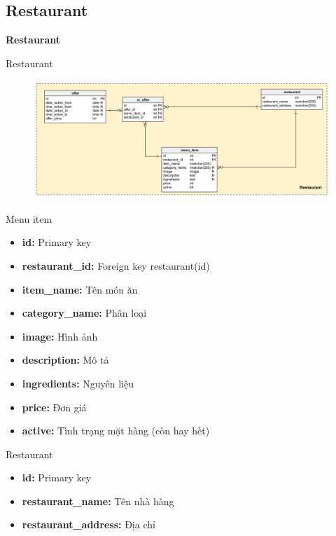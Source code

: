 \documentclass[aspectratio=43,xcolor=dvipsnames]{beamer}
\begin{document}
	\subsection{Restaurant}
	\begin{frame}
		\textcolor{structure}{\Huge{\textbf{Restaurant}}}
	\end{frame}
	\begin{frame}{Restaurant}
		\begin{figure}[ht!]
			\centerline{\includegraphics[width=1\textwidth]{restaurant.png}}
			\label{fig:ass1}
		\end{figure}
	\end{frame}
	\begin{frame}{Menu item}
		\begin{itemize}
			\item \textbf{id:} Primary key
			\item \textbf{restaurant\_id:} Foreign key restaurant(id)
			\item \textbf{item\_name:} Tên món ăn
			\item \textbf{category\_name:} Phân loại
			\item \textbf{image:} Hình ảnh
			\item \textbf{description:} Mô tả
			\item \textbf{ingredients:} Nguyên liệu
			\item \textbf{price:} Đơn giá
			\item \textbf{active:} Tình trạng mặt hàng (còn hay hết)
		\end{itemize}
	\end{frame}
	
	\begin{frame}{Restaurant}
		\begin{itemize}
			\item \textbf{id:} Primary key
			\item \textbf{restaurant\_name:} Tên nhà hàng
			\item \textbf{restaurant\_address:} Địa chỉ
		\end{itemize}
	\end{frame}
	
\end{document}
